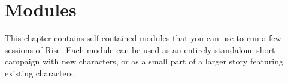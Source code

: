 \chapter{Modules}

This chapter contains self-contained modules that you can use to run a few sessions of Rise.
Each module can be used as an entirely standalone short campaign with new characters, or as a small part of a larger story featuring existing characters.


